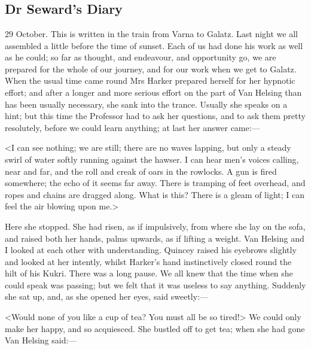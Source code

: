 \chapter[Chapter \thechapter]{}

\section{Dr Seward's Diary}
\begin{diary}{29 October.}
This is written in the train from Varna to Galatz. Last night we all assembled a little before the time of sunset. Each of us had done his work as well as he could; so far as thought, and endeavour, and opportunity go, we are prepared for the whole of our journey, and for our work when we get to Galatz. When the usual time came round Mrs Harker prepared herself for her hypnotic effort; and after a longer and more serious effort on the part of Van Helsing than has been usually necessary, she sank into the trance. Usually she speaks on a hint; but this time the Professor had to ask her questions, and to ask them pretty resolutely, before we could learn anything; at last her answer came:—

<I can see nothing; we are still; there are no waves lapping, but only a steady swirl of water softly running against the hawser. I can hear men's voices calling, near and far, and the roll and creak of oars in the rowlocks. A gun is fired somewhere; the echo of it seems far away. There is tramping of feet overhead, and ropes and chains are dragged along. What is this? There is a gleam of light; I can feel the air blowing upon me.>

Here she stopped. She had risen, as if impulsively, from where she lay on the sofa, and raised both her hands, palms upwards, as if lifting a weight. Van Helsing and I looked at each other with understanding. Quincey raised his eyebrows slightly and looked at her intently, whilst Harker's hand instinctively closed round the hilt of his Kukri. There was a long pause. We all knew that the time when she could speak was passing; but we felt that it was useless to say anything. Suddenly she sat up, and, as she opened her eyes, said sweetly:—

<Would none of you like a cup of tea? You must all be so tired!> We could only make her happy, and so acquiesced. She bustled off to get tea; when she had gone Van Helsing said:—


\end{diary}
